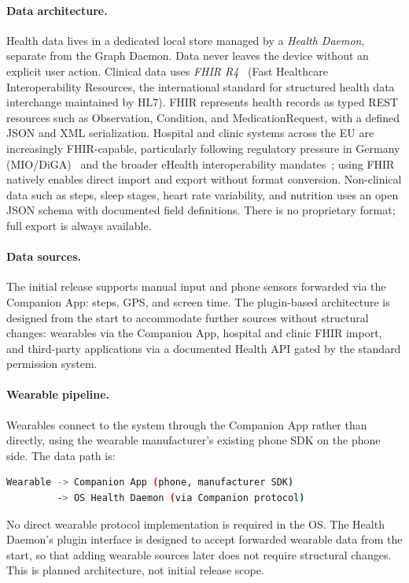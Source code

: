 \paragraph{Data architecture.}
Health data lives in a dedicated local store managed by a \emph{Health Daemon},
separate from the Graph Daemon. Data never leaves the device without an
explicit user action. Clinical data uses \emph{FHIR R4}~\cite{fhir:r4} (Fast Healthcare
Interoperability Resources, the international standard for structured health
data interchange maintained by HL7). FHIR represents health records as typed
REST resources such as Observation, Condition, and MedicationRequest, with
a defined JSON and XML serialization. Hospital and clinic systems across the EU
are increasingly FHIR-capable, particularly following regulatory pressure in
Germany (MIO/DiGA)~\cite{gematik:mio} and the broader eHealth interoperability
mandates~\cite{eu:ehealth}; using FHIR natively enables direct import and export
without format conversion. Non-clinical data such as steps,
sleep stages, heart rate variability, and nutrition uses an open JSON schema
with documented field definitions. There is no proprietary format; full export
is always available.

\paragraph{Data sources.}
The initial release supports manual input and phone sensors forwarded via the
Companion App: steps, GPS, and screen time. The plugin-based architecture is
designed from the start to accommodate further sources without structural
changes: wearables via the Companion App, hospital and clinic FHIR import, and
third-party applications via a documented Health API gated by the standard
permission system.

\paragraph{Wearable pipeline.}
Wearables connect to the system through the Companion App rather than directly,
using the wearable manufacturer's existing phone SDK on the phone side. The
data path is:

\begin{lstlisting}[language=bash, caption={Wearable data path}]
Wearable -> Companion App (phone, manufacturer SDK)
         -> OS Health Daemon (via Companion protocol)
\end{lstlisting}

No direct wearable protocol implementation is required in the OS. The Health
Daemon's plugin interface is designed to accept forwarded wearable data from
the start, so that adding wearable sources later does not require structural
changes. This is planned architecture, not initial release scope.

